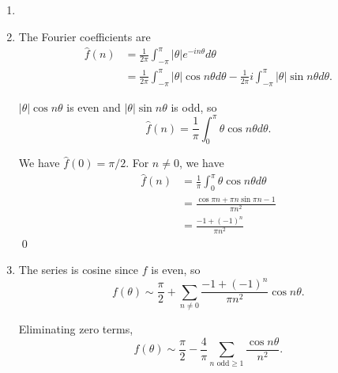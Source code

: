 \documentclass[oneside]{article}
\newcommand\abs[1]{\left|#1\right|}
\begin{document}
  \begin{enumerate}[label=(\alph*)]
    \item\hspace{0pt}


    \item The Fourier coefficients are\begin{align*}
      \hat f(n)
      &= \frac{1}{2\pi}\int_{-\pi}^\pi \abs{\theta} e^{-in\theta} d\theta \\
      &= \frac{1}{2\pi}\int_{-\pi}^\pi \abs{\theta} \cos n\theta d\theta
      - \frac{1}{2\pi}i\int_{-\pi}^\pi \abs{\theta} \sin n\theta d\theta
      \text{.}
    \end{align*}

    $\abs{\theta} \cos n\theta$ is even and $\abs{\theta} \sin n\theta$ is odd,
    so \[
      \hat f(n) = \frac{1}{\pi}\int_{0}^\pi \theta \cos n\theta d\theta \text{.}
    \]

    We have $\hat f(0) = \pi/2$. For $n \neq 0$, we have \begin{align*}
      \hat f(n) &= \frac{1}{\pi}\int_{0}^\pi \theta \cos n\theta d\theta \\
      &= \frac{\cos\pi n +\pi n \sin\pi n - 1}{\pi n^2} \\
      &= \frac{-1 + (-1)^n}{\pi n^2}
    \end{align*} \qed

    \item The series is cosine since $f$ is even, so \[
      f(\theta)
      \sim \frac{\pi}{2} +
      \sum_{n\neq0}\frac{-1 + (-1)^n}{\pi n^2}\cos n \theta \text{.}
    \]

    Eliminating zero terms,\begin{equation}
      \label{eq:fourier-series}
      f(\theta)
      \sim \frac{\pi}{2} -
      \frac{4}{\pi}\sum_{n\text{ odd}\geq1}\frac{\cos n \theta}{n^2} \text{.}
    \end{equation}


\end{enumerate}
\end{document}
